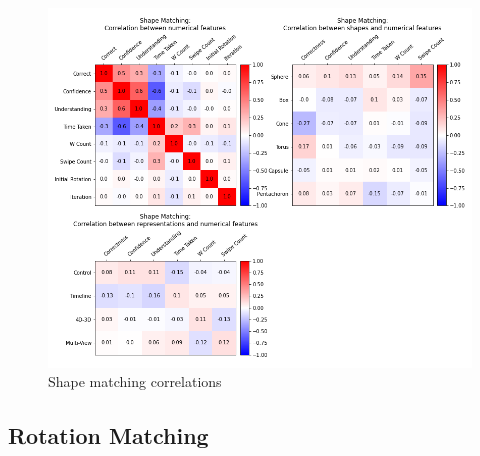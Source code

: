 \documentclass{l4proj}
\begin{document}
\begin{figure}[H]
  \includegraphics[width=\textwidth]{images/results/shape_matching_correlations.png}
  \caption{Shape matching correlations}
  \label{fig:shape_corr}
\end{figure}

\subsection*{Rotation Matching}
\end{document}
